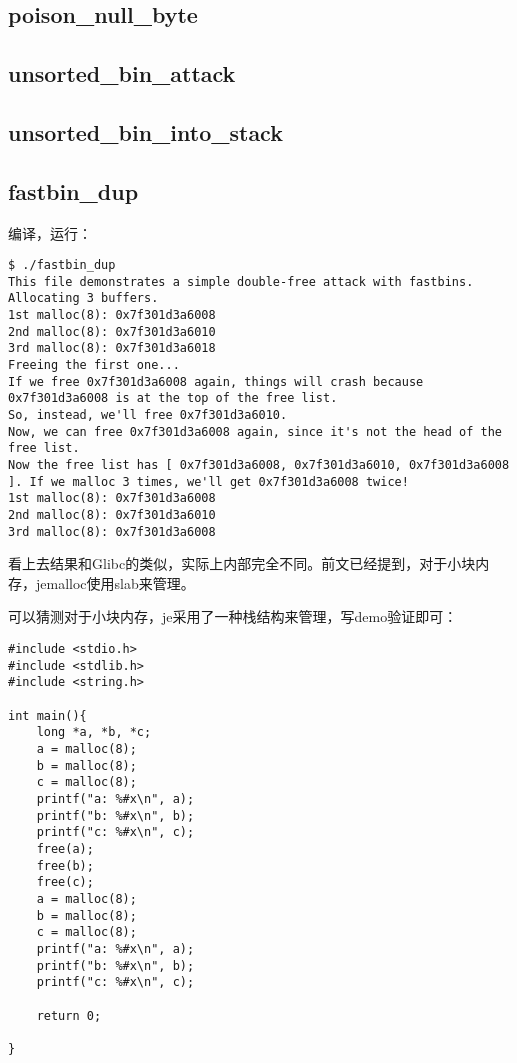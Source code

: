 \subsection{poison\_null\_byte}

\subsection{unsorted\_bin\_attack}

\subsection{unsorted\_bin\_into\_stack}

\subsection{fastbin\_dup}

编译，运行：
\begin{verbatim}
$ ./fastbin_dup
This file demonstrates a simple double-free attack with fastbins.
Allocating 3 buffers.
1st malloc(8): 0x7f301d3a6008
2nd malloc(8): 0x7f301d3a6010
3rd malloc(8): 0x7f301d3a6018
Freeing the first one...
If we free 0x7f301d3a6008 again, things will crash because 0x7f301d3a6008 is at the top of the free list.
So, instead, we'll free 0x7f301d3a6010.
Now, we can free 0x7f301d3a6008 again, since it's not the head of the free list.
Now the free list has [ 0x7f301d3a6008, 0x7f301d3a6010, 0x7f301d3a6008 ]. If we malloc 3 times, we'll get 0x7f301d3a6008 twice!
1st malloc(8): 0x7f301d3a6008
2nd malloc(8): 0x7f301d3a6010
3rd malloc(8): 0x7f301d3a6008

\end{verbatim}

看上去结果和Glibc的类似，实际上内部完全不同。前文已经提到，对于小块内存，jemalloc使用slab来管理。

可以猜测对于小块内存，je采用了一种栈结构来管理，写demo验证即可：
\begin{verbatim}
#include <stdio.h>
#include <stdlib.h>
#include <string.h>

int main(){
    long *a, *b, *c;
    a = malloc(8);
    b = malloc(8);
    c = malloc(8);
    printf("a: %#x\n", a);
    printf("b: %#x\n", b);
    printf("c: %#x\n", c);
    free(a);
    free(b);
    free(c);
    a = malloc(8);
    b = malloc(8);
    c = malloc(8);
    printf("a: %#x\n", a);
    printf("b: %#x\n", b);
    printf("c: %#x\n", c);

    return 0;

}

\end{verbatim}

